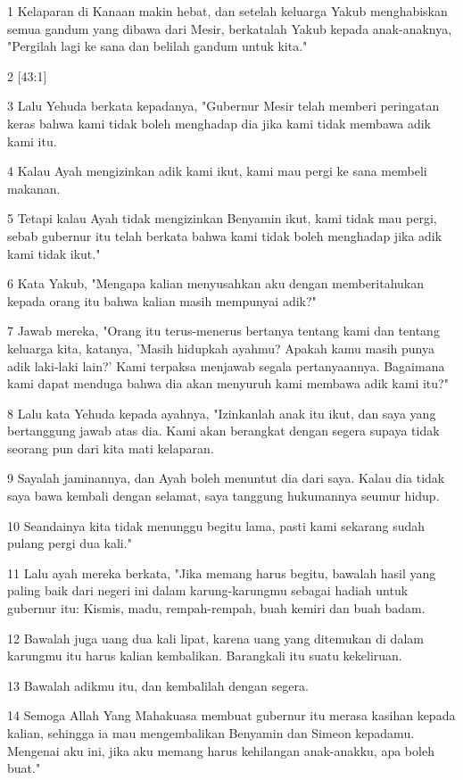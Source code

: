\par 1 Kelaparan di Kanaan makin hebat, dan setelah keluarga Yakub menghabiskan semua gandum yang dibawa dari Mesir, berkatalah Yakub kepada anak-anaknya, "Pergilah lagi ke sana dan belilah gandum untuk kita."
\par 2 [43:1]
\par 3 Lalu Yehuda berkata kepadanya, "Gubernur Mesir telah memberi peringatan keras bahwa kami tidak boleh menghadap dia jika kami tidak membawa adik kami itu.
\par 4 Kalau Ayah mengizinkan adik kami ikut, kami mau pergi ke sana membeli makanan.
\par 5 Tetapi kalau Ayah tidak mengizinkan Benyamin ikut, kami tidak mau pergi, sebab gubernur itu telah berkata bahwa kami tidak boleh menghadap jika adik kami tidak ikut."
\par 6 Kata Yakub, "Mengapa kalian menyusahkan aku dengan memberitahukan kepada orang itu bahwa kalian masih mempunyai adik?"
\par 7 Jawab mereka, "Orang itu terus-menerus bertanya tentang kami dan tentang keluarga kita, katanya, 'Masih hidupkah ayahmu? Apakah kamu masih punya adik laki-laki lain?' Kami terpaksa menjawab segala pertanyaannya. Bagaimana kami dapat menduga bahwa dia akan menyuruh kami membawa adik kami itu?"
\par 8 Lalu kata Yehuda kepada ayahnya, "Izinkanlah anak itu ikut, dan saya yang bertanggung jawab atas dia. Kami akan berangkat dengan segera supaya tidak seorang pun dari kita mati kelaparan.
\par 9 Sayalah jaminannya, dan Ayah boleh menuntut dia dari saya. Kalau dia tidak saya bawa kembali dengan selamat, saya tanggung hukumannya seumur hidup.
\par 10 Seandainya kita tidak menunggu begitu lama, pasti kami sekarang sudah pulang pergi dua kali."
\par 11 Lalu ayah mereka berkata, "Jika memang harus begitu, bawalah hasil yang paling baik dari negeri ini dalam karung-karungmu sebagai hadiah untuk gubernur itu: Kismis, madu, rempah-rempah, buah kemiri dan buah badam.
\par 12 Bawalah juga uang dua kali lipat, karena uang yang ditemukan di dalam karungmu itu harus kalian kembalikan. Barangkali itu suatu kekeliruan.
\par 13 Bawalah adikmu itu, dan kembalilah dengan segera.
\par 14 Semoga Allah Yang Mahakuasa membuat gubernur itu merasa kasihan kepada kalian, sehingga ia mau mengembalikan Benyamin dan Simeon kepadamu. Mengenai aku ini, jika aku memang harus kehilangan anak-anakku, apa boleh buat."
